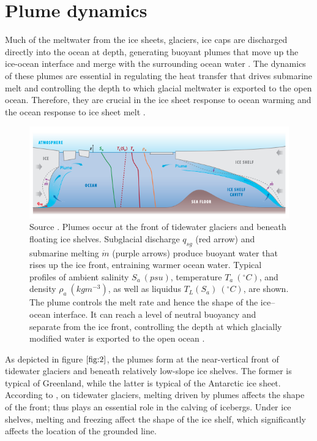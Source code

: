 \documentclass[11pt,a4paper]{article}
\begin{document}
	\section{Plume dynamics}
	Much of the meltwater from the ice sheets, glaciers, ice caps are discharged directly into the ocean at depth, generating buoyant plumes that move up the ice-ocean interface and merge with the surrounding ocean water \citep{hewitt2020subglacial}. The dynamics of these plumes are essential in regulating the heat transfer that drives submarine melt and controlling the depth to which glacial meltwater is exported to the open ocean. Therefore, they are crucial in the ice sheet response to ocean warming \citep{joughin2012ice, hewitt2020subglacial} and the ocean response to ice sheet melt \citep{straneo2013north}. 
	
		\begin{figure}[H]
	    \centering 
	    \includegraphics[width=15cm]{plume.png}
	    \caption{Source \cite{hewitt2020subglacial}. Plumes occur at the front of tidewater glaciers and beneath floating ice shelves. Subglacial discharge $q_{sg}$ (red arrow) and submarine melting $\dot{m}$ (purple arrows) produce buoyant water that rises up the ice front, entraining warmer ocean water. Typical profiles of ambient salinity $S_a\ (psu)$, temperature $T_a\ (^{\circ} C)$, and density $\rho_a\ (kg m^{-3})$, as well as liquidus $T_L(S_a)\ (^{\circ} C)$, are shown. The plume controls the melt rate and hence the shape of the ice–ocean interface. It can reach a level of neutral buoyancy and separate from the ice front, controlling the depth at which glacially modified water is exported to the open ocean \citep{hewitt2020subglacial}.}%
	    \label{fig:2}
	\end{figure}
	
	
	\noindent As depicted in figure $\ref{fig:2}$, the plumes form at the near-vertical front of tidewater glaciers and beneath relatively low-slope ice shelves. The former is typical of Greenland, while the latter is typical of the Antarctic ice sheet. According to \cite{hewitt2020subglacial}, on tidewater glaciers, melting driven by plumes affects the shape of the front; thus plays an essential role in the calving of icebergs. Under ice shelves, melting and freezing affect the shape of the ice shelf, which significantly affects the location of the grounded line.%
	
\end{document}
